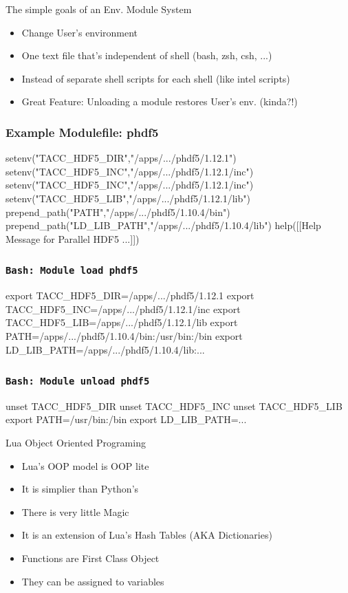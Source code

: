 \documentclass{beamer}
\begin{document}
\begin{frame}{The simple goals of an Env. Module System}
  \begin{itemize}
    \item Change User's environment
    \item One text file that's independent of shell (bash, zsh, csh, ...)
    \item Instead of separate shell scripts for each shell (like intel scripts)
    \item Great Feature: Unloading a module restores User's env. (kinda?!)
  \end{itemize}
\end{frame}

\begin{frame}[fragile]
  \frametitle{Example Modulefile: phdf5}
    {\tiny
\begin{semiverbatim}

setenv("TACC\_HDF5\_DIR","/apps/.../phdf5/1.12.1")
setenv("TACC\_HDF5\_INC","/apps/.../phdf5/1.12.1/inc")
setenv("TACC\_HDF5\_INC","/apps/.../phdf5/1.12.1/inc")
setenv("TACC\_HDF5\_LIB","/apps/.../phdf5/1.12.1/lib")
prepend\_path("PATH","/apps/.../phdf5/1.10.4/bin")
prepend\_path("LD\_LIB\_PATH","/apps/.../phdf5/1.10.4/lib")
help([[Help Message for Parallel HDF5 ...]])
\end{semiverbatim}
    }
\end{frame}

\begin{frame}[fragile]
  \frametitle{\texttt{Bash: Module load phdf5}}
    {\small
\begin{semiverbatim}
export TACC\_HDF5\_DIR=/apps/.../phdf5/1.12.1
export TACC\_HDF5\_INC=/apps/.../phdf5/1.12.1/inc
export TACC\_HDF5\_LIB=/apps/.../phdf5/1.12.1/lib
export PATH=/apps/.../phdf5/1.10.4/bin:/usr/bin:/bin
export LD\_LIB\_PATH=/apps/.../phdf5/1.10.4/lib:...
\end{semiverbatim}
    }
\end{frame}

\begin{frame}[fragile]
  \frametitle{\texttt{Bash: Module unload phdf5}}
    {\small
\begin{semiverbatim}
unset TACC\_HDF5\_DIR
unset TACC\_HDF5\_INC
unset TACC\_HDF5\_LIB
export PATH=/usr/bin:/bin
export LD\_LIB\_PATH=...
\end{semiverbatim}
    }
\end{frame}

\begin{frame}{Lua Object Oriented Programing}
  \begin{itemize}
    \item Lua's OOP model is OOP lite
    \item It is simplier than Python's
    \item There is very little Magic
    \item It is an extension of Lua's Hash Tables (AKA Dictionaries)
    \item Functions are First Class Object
    \item They can be assigned to variables
  \end{itemize}
\end{frame}
\end{document}
